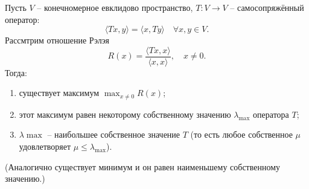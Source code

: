 \documentclass[14pt]{extreport}
\begin{document}
    \begin{thbox}
        Пусть $V$ – конечномерное евклидово пространство, $T: V \rightarrow V$ – самосопряжённый оператор:
        \[
        \langle Tx,y \rangle = \langle x,Ty \rangle \quad \forall x,y \in V.
        \]
        Рассмтрим отношение Рэлэя
        \[
        R(x) = \frac{\langle Tx,x \rangle}{\langle x,x \rangle}, \quad x \neq 0.
        \]
        Тогда:
        \begin{enumerate}
            \item существует максимум $\max_{x \neq 0} R(x)$;
            \item этот максимум равен некоторому собственному значению $\lambda_{\max}$ оператора $T$;
            \item $\lambda{\max}$ – наибольшее собственное значение $T$ (то есть любое собственное $\mu$ удовлетворяет $\mu \leq \lambda_{\max}$).
        \end{enumerate}
        (Аналогично существует минимум и он равен наименьшему собственному значению.)
    \end{thbox}
\end{document}
